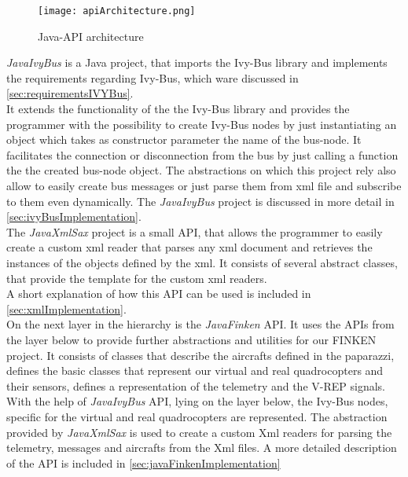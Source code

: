 \begin{figure}[h!]
 \begin{center}
  \texttt{[image: apiArchitecture.png]}
 \end{center}
  \caption{Java-API architecture\label{fig:apiArchitecture}}
\end{figure}

\textit{JavaIvyBus} is a Java project, that imports the Ivy-Bus library and implements the requirements regarding Ivy-Bus, which ware discussed in \ref{sec:requirementsIVYBus}.\\ 
It extends the functionality of the the Ivy-Bus library and provides the programmer with the possibility to create Ivy-Bus nodes by just instantiating an object which takes as constructor parameter the name of the bus-node. It facilitates the connection or disconnection from the bus by just calling a function the the created bus-node object. The abstractions on which this project rely also allow to easily create bus messages or just parse them from xml file and subscribe to them even dynamically. The \textit{JavaIvyBus} project is discussed in more detail in \ref{sec:ivyBusImplementation}. \\

The \textit{JavaXmlSax} project is a small API, that allows the programmer to easily create a custom xml reader that parses any xml document and retrieves the instances of the objects defined by the xml. It consists of several abstract classes, that provide the template for the custom xml readers.\\
A short explanation of how this API can be used is included in \ref{sec:xmlImplementation}. \\

On the next layer in the hierarchy is the \textit{JavaFinken} API. It uses the APIs from the layer below to provide further abstractions and utilities for our FINKEN project. It consists of classes that describe 
the aircrafts defined in the paparazzi, defines the basic classes that represent our virtual and real quadrocopters and their sensors, defines a representation of the telemetry and the V-REP signals. With the help of \textit{JavaIvyBus} API, lying on the layer below, the Ivy-Bus nodes, specific for the virtual and real quadrocopters are represented. The abstraction provided by \textit{JavaXmlSax} is used to create a custom Xml readers for parsing the telemetry, messages and aircrafts from the Xml files. A more detailed description of the API is included in \ref{sec:javaFinkenImplementation} \\


